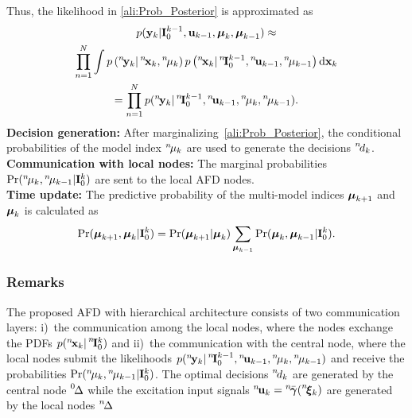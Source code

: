 \documentclass[conference,10pt]{IEEEtran}
\def\zeroth{\prescript{0\!}{}}
\def\nth{\prescript{n\!}{}}
\begin{document}
Thus, the likelihood in \eqref{ali:Prob_Posterior} is approximated as
\begin{multline} \label{ali:likelihoodApprox}
	p(\bfy_{k}|\bfI_0^{k-1},\bfu_{k-1},\bfmu_{k},\bfmu_{k-1}) \approx\\
	\prod_{n=1}^{N} \int p\left( \nth{\bfy}_{k}|\nth{\bfx}_{k},\nth{\mu}_{k} \right) p\left( \nth{\bfx}_{k} | \nth{\bfI}_{0}^{k-1},\nth{\bfu}_{k-1},\nth{\mu}_{k-1} \right) \mathrm{d}\bfx_{k}\\
	=\prod_{n=1}^{N} p(\nth{\bfy}_k\vert\nth{\bfI}_0^{k-1},\nth{\bfu}_{k-1},\nth{\mu}_k,\nth{\mu}_{k-1}).
\end{multline}
\textbf{Decision generation:} After marginalizing~\eqref{ali:Prob_Posterior}, the conditional probabilities of the model index $\nth{\mu}_{k}$ are used to generate the decisions $\nth{d}_{k}$.\\
\textbf{Communication with local nodes:} The marginal probabilities $\Pr(\nth{\mu}_k,\nth{\mu}_{k-1}|\bfI_0^k)$ are sent to the local AFD nodes.\\
\textbf{Time update:} The predictive probability of the multi-model indices $\boldsymbol{\mu}_{k+1}$ and $\boldsymbol{\mu}_k$ is calculated as 
\begin{align*}
	\Pr(\boldsymbol{\mu}_{k+1},\boldsymbol{\mu}_k|\mathbf{I}_0^k) = \Pr(\boldsymbol{\mu}_{k+1}|\boldsymbol{\mu}_k) \sum_{\boldsymbol{\mu}_{k-1}} \Pr(\boldsymbol{\mu}_k,\boldsymbol{\mu}_{k-1}|\mathbf{I}_0^k).
\end{align*}
\subsubsection{Remarks}\label{sec:remarks}
The proposed AFD with hierarchical architecture consists of two communication layers: i)~the communication among the local nodes, where the nodes exchange the PDFs $p(\nth{\bfx}_k\vert\nth{\bfI}^k_0)$ and ii)~the communication with the central node, where the local nodes submit the likelihoods $p(\nth{\bfy}_k\vert\nth{\bfI}_0^{k-1},\nth{\bfu}_{k-1},\nth{\mu}_k,\nth{\mu}_{k-1})$ and receive the probabilities $\Pr(\nth{\mu}_k,\nth{\mu}_{k-1}|\bfI_0^k)$.
  The optimal decisions $\nth{d}_{k}$ are generated by the central node $\zeroth{\Delta}$ while the excitation input signals $\nth{\bfu}_{k}=\nth{\bar{\bfgamma}}(\nth{\bfxi}_k)$ are generated by the local nodes $\nth{\Delta}$  
\end{document}
